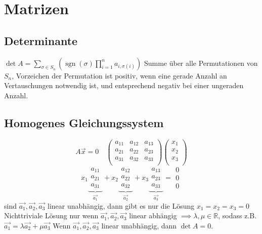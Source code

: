 \documentclass[a4paper]{scrartcl}
\begin{document}
\section{Matrizen}
\label{sec-13}
\subsection{Determinante}
\label{sec-13-1}
$\det A = \sum_{\sigma \in S_n} \left(\operatorname{sgn}(\sigma) \prod_{i=1}^n a_{i, \sigma(i)}\right)$
Summe über alle Permutationen von $S_n$, Vorzeichen der Permutation ist positiv, wenn eine gerade Anzahl an Vertauschungen notwendig ist, und entsprechend negativ bei einer ungeraden Anzahl.
\subsection{Homogenes Gleichungssystem}
\label{sec-13-2}
\[A\vec{x}=0\quad \begin{pmatrix}
   a_{11} & a_{12} & a_{13} \\
   a_{21} & a_{22} & a_{23} \\
   a_{31} & a_{32} & a_{33} \\
   \end{pmatrix}\begin{pmatrix}
   x_1\\
   x_2\\
   x_3\\
   \end{pmatrix}\] 
\[
   x_1 \underbrace{ \begin{matrix} a_{11} \\ a_{21} \\ a_{31} \end{matrix}}_{\vec{a_1}} +
   x_2 \underbrace{ \begin{matrix} a_{12} \\ a_{22} \\ a_{32} \end{matrix}}_{\vec{a_2}} +
   x_3 \underbrace{ \begin{matrix} a_{13} \\ a_{23} \\ a_{33} \end{matrix}}_{\vec{a_3}}
   = \begin{matrix} 0 \\ 0 \\ 0\end{matrix}
   \]
sind $\vec{a_1},\vec{a_2}, \vec{a_3}$ linear unabhängig, dann gibt es nur die Lösung $x_1=x_2=x_3=0$
Nichttriviale Lösung nur wenn $\vec{a_1},\vec{a_2}, \vec{a_3}$ linear abhängig $\implies \lambda,\mu\in\mathbb{R}$, sodass z.B. $\vec{a_1} = \lambda\vec{a_2} + \mu\vec{a_3}$
Wenn $\vec{a_1},\vec{a_2}, \vec{a_3}$ linear unabhängig, dann $\det A = 0$.
\end{document}
